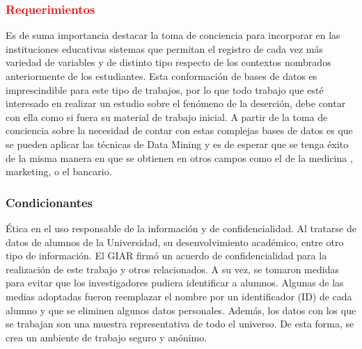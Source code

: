 
\subsubsection{\textcolor{red}{Requerimientos}}
Es de suma importancia destacar la toma de conciencia para incorporar en las instituciones educativas sistemas que permitan el registro de cada vez más variedad de variables y de distinto tipo respecto de los contextos nombrados anteriormente de los estudiantes.
Esta conformación de bases de datos es imprescindible para este tipo de trabajos, por lo que todo trabajo que esté interesado en realizar un estudio sobre el fenómeno de la deserción, debe contar con ella como si fuera su material de trabajo inicial.
A partir de la toma de conciencia sobre la necesidad de contar con estas complejas bases de datos es que se pueden aplicar las técnicas de Data Mining y es de esperar que se tenga éxito de la misma manera en que se obtienen en otros campos como el de la medicina \cite{Adnan2013DataReview}, marketing, o el bancario\cite{Kirkos2007DataStatements}.


\subsubsection{Condicionantes}
Ética en el uso responsable de la información y de confidencialidad.
Al tratarse de datos de alumnos de la Universidad, su desenvolvimiento académico, entre otro tipo de información. El GIAR  firmó un acuerdo de confidencialidad para la realización de este trabajo y otros relacionados. A su vez, se tomaron medidas para evitar que los investigadores pudiera identificar a alumnos. Algunas de las medias adoptadas fueron reemplazar el nombre por un identificador (ID) de cada alumno y que se
eliminen algunos datos personales.
Además, los datos con los que se trabajan son una muestra representativa de todo el universo.
De esta forma, se crea un ambiente de trabajo seguro y anónimo.
